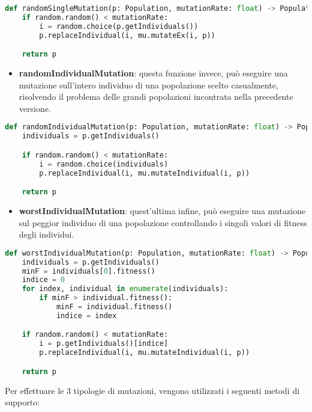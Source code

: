 \documentclass{article}
\begin{document}
\begin{lstlisting}[language=Python]
def randomSingleMutation(p: Population, mutationRate: float) -> Population:
    if random.random() < mutationRate:
        i = random.choice(p.getIndividuals())
        p.replaceIndividual(i, mu.mutateEx(i, p))

    return p
\end{lstlisting}

\begin{itemize}
\item\textbf{randomIndividualMutation}: questa funzione invece, può eseguire una mutazione sull'intero individuo di una popolazione scelto casualmente, risolvendo il problema delle grandi popolazioni incontrata nella precedente versione.
\end{itemize}

\begin{lstlisting}[language=Python]
def randomIndividualMutation(p: Population, mutationRate: float) -> Population:
    individuals = p.getIndividuals()

    if random.random() < mutationRate:
        i = random.choice(individuals)
        p.replaceIndividual(i, mu.mutateIndividual(i, p))

    return p
\end{lstlisting}


\begin{itemize}
\item\textbf{worstIndividualMutation}: quest'ultima infine, può eseguire una mutazione sul peggior individuo di una popolazione controllando i singoli valori di fitness degli individui.
\end{itemize}

\begin{lstlisting}[language=Python]
def worstIndividualMutation(p: Population, mutationRate: float) -> Population:
    individuals = p.getIndividuals()
    minF = individuals[0].fitness()
    indice = 0
    for index, individual in enumerate(individuals):
        if minF > individual.fitness():
            minF = individual.fitness()
            indice = index

    if random.random() < mutationRate:
        i = p.getIndividuals()[indice]
        p.replaceIndividual(i, mu.mutateIndividual(i, p))

    return p
        \end{lstlisting}

\pagebreak

Per effettuare le 3 tipologie di mutazioni, vengono utilizzati i seguenti metodi di supporto:
\end{document}
